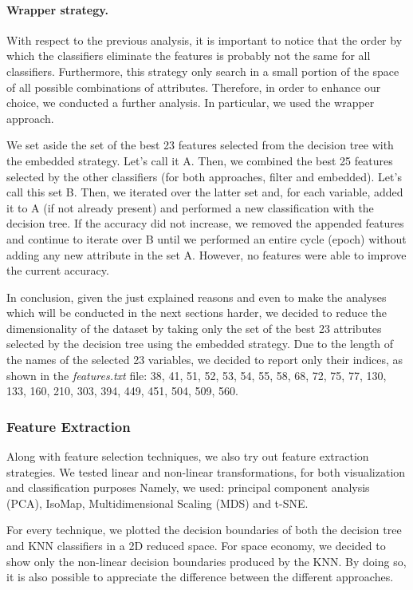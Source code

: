 \documentclass[10pt, a4paper, twocolumn]{article}
\begin{document}
\paragraph{Wrapper strategy.}
With respect to the previous analysis, it is important to notice that the order by which the classifiers eliminate the features is probably not the same for all classifiers. Furthermore, this strategy only search in a small portion of the space of all possible combinations of attributes. Therefore, in order to enhance our choice, we conducted a further analysis. In particular, we used the wrapper approach. 

We set aside the set of the best 23 features selected from the decision tree with the embedded strategy. Let's call it A. Then, we combined the best 25 features selected by the other classifiers (for both approaches, filter and embedded). Let's call this set B. Then, we iterated over the latter set and, for each variable, added it to A (if not already present) and performed a new classification with the decision tree. If the accuracy did not increase, we removed the appended features and continue to iterate over B until we performed an entire cycle (epoch) without adding any new attribute in the set A. However, no features were able to improve the current accuracy. 

In conclusion, given the just explained reasons and even to make the analyses which will be conducted in the next sections harder, we decided to reduce the dimensionality of the dataset by taking only the set of the best 23 attributes selected by the decision tree using the embedded strategy. Due to the length of the names of the selected 23 variables, we decided to report only their indices, as shown in the \textit{features.txt} file: 38, 41, 51, 52, 53, 54, 55, 58, 68, 72, 75, 77, 130, 133, 160, 210, 303, 394, 449, 451, 504, 509, 560.

\subsubsection{Feature Extraction}

Along with feature selection techniques, we also try out feature extraction strategies. We tested linear and non-linear transformations, for both visualization and classification purposes Namely, we used: principal component analysis (PCA), IsoMap, Multidimensional Scaling (MDS) and t-SNE.

For every technique, we plotted the decision boundaries of both the decision tree and KNN classifiers in a 2D reduced space. For space economy, we decided to show only the non-linear decision boundaries produced by the KNN. By doing so, it is also possible to appreciate the difference between the different approaches.
\end{document}
